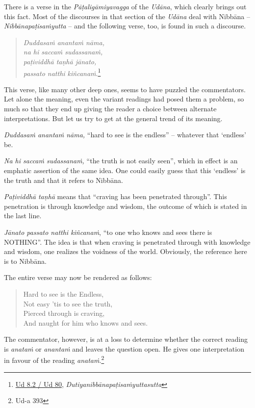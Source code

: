 There is a verse in the \emph{Pāṭaligāmiyavagga} of the \emph{Udāna}, which clearly brings out this fact. Most of the discourses in that section of the \emph{Udāna} deal with Nibbāna -- \emph{Nibbānapaṭisaṁyutta} -- and the following verse, too, is found in such a discourse.

\begin{quote}
\emph{Duddasaṁ anantaṁ nāma,}\\
\emph{na hi saccaṁ sudassanaṁ,}\\
\emph{paṭividdhā taṇhā jānato,}\\
\emph{passato natthi kiñcanaṁ}.\footnote{\href{https://suttacentral.net/ud8.2/pli/ms}{Ud 8.2 / Ud 80}, \emph{Dutiyanibbānapaṭisaṁyuttasutta}}
\end{quote}

This verse, like many other deep ones, seems to have puzzled the commentators. Let alone the meaning, even the variant readings had posed them a problem, so much so that they end up giving the reader a choice between alternate interpretations. But let us try to get at the general trend of its meaning.

\emph{Duddasaṁ anantaṁ nāma,} ``hard to see is the endless'' -- whatever that `endless' be.

\emph{Na hi saccaṁ sudassanaṁ,} ``the truth is not easily seen'', which in effect is an emphatic assertion of the same idea. One could easily guess that this `endless' is the truth and that it refers to Nibbāna.

\emph{Paṭividdhā taṇhā} means that ``craving has been penetrated through''. This penetration is through knowledge and wisdom, the outcome of which is stated in the last line.

\emph{Jānato passato natthi kiñcanaṁ}, ``to one who knows and sees there is \mbox{NOTHING}''. The idea is that when craving is penetrated through with knowledge and wisdom, one realizes the voidness of the world. Obviously, the reference here is to Nibbāna.

The entire verse may now be rendered as follows:

\begin{quote}
Hard to see is the Endless,\\
Not easy 'tis to see the truth,\\
Pierced through is craving,\\
And naught for him who knows and sees.
\end{quote}

The commentator, however, is at a loss to determine whether the correct reading is \emph{anataṁ} or \emph{anantaṁ} and leaves the question open. He gives one interpretation in favour of the reading \emph{anataṁ}.\footnote{Ud-a 393}

